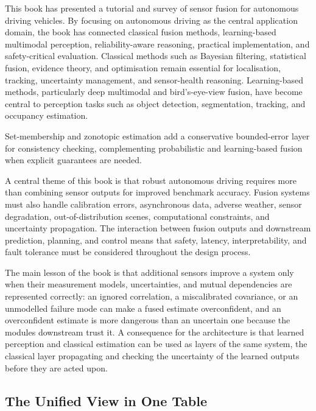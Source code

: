 \documentclass[graybox,envcountchap]{style/SNmono}
\begin{document}
This book has presented a tutorial and survey of sensor fusion for autonomous driving vehicles. By focusing on autonomous driving as the central application domain, the book has connected classical fusion methods, learning-based multimodal perception, reliability-aware reasoning, practical implementation, and safety-critical evaluation. Classical methods such as Bayesian filtering, statistical fusion, evidence theory, and optimisation remain essential for localisation, tracking, uncertainty management, and sensor-health reasoning. Learning-based methods, particularly deep multimodal and bird's-eye-view fusion, have become central to perception tasks such as object detection, segmentation, tracking, and occupancy estimation.

Set-membership and zonotopic estimation add a conservative bounded-error layer for consistency checking, complementing probabilistic and learning-based fusion when explicit guarantees are needed.

A central theme of this book is that robust autonomous driving requires more than combining sensor outputs for improved benchmark accuracy. Fusion systems must also handle calibration errors, asynchronous data, adverse weather, sensor degradation, out-of-distribution scenes, computational constraints, and uncertainty propagation. The interaction between fusion outputs and downstream prediction, planning, and control means that safety, latency, interpretability, and fault tolerance must be considered throughout the design process.


The main lesson of the book is that additional sensors improve a system only when their measurement models, uncertainties, and mutual dependencies are represented correctly: an ignored correlation, a miscalibrated covariance, or an unmodelled failure mode can make a fused estimate overconfident, and an overconfident estimate is more dangerous than an uncertain one because the modules downstream trust it. A consequence for the architecture is that learned perception and classical estimation can be used as layers of the same system, the classical layer propagating and checking the uncertainty of the learned outputs before they are acted upon.

\subsection*{The Unified View in One Table}
\end{document}
